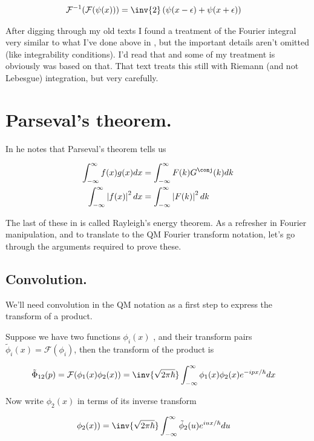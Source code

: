 \documentclass{article}
\newcommand{\FF}[0]{\mathcal{F}}
\newcommand{\FM}[0]{\inv{\sqrt{2\pi\hbar}}}
\newcommand{\Iinf}[1]{ \int_{-\infty}^\infty {#1}}
\begin{document}
\begin{align*}
\FF^{-1}(\FF(\psi(x))) &= \inv{2} \left( \psi(x -\epsilon) + \psi(x + \epsilon) \right)
\end{align*}

After digging through my old texts I found a treatment of the Fourier integral very similar to what I've done above
in \cite{lepage1980cva}, but the important details aren't omitted (like integrability conditions).
I'd read that and some of my treatment is obviously was based on that.  That text 
treats this still with Riemann (and not Lebesgue) integration, but very carefully.

\section{ Parseval's theorem. }

In \cite{mcmahon2005qmd} he notes that Parseval's theorem tells us

\begin{align*}
\Iinf{f(x)g(x) dx} &= \Iinf{F(k)G^\conj(k) dk} \\
\Iinf{\Abs{f(x)}^2 dx} &= \Iinf{\Abs{F(k)}^2 dk}
\end{align*}

The last of these in \cite{haykin1994cs} is called Rayleigh's energy theorem.  
As a refresher in 
Fourier manipulation, and to translate to the QM Fourier transform notation, let's go through the arguments
required to prove these.

\subsection{ Convolution. }

We'll need convolution in the QM notation as a first step to express
the transform of a product.

Suppose we have two functions 
$\phi_i(x)$
, and their transform
pairs 
$\tilde{\phi}_i(x) = \FF(\phi_i)$, then the transform of the product is

\begin{align*}
\tilde{\Phi}_{12}(p) = \FF(\phi_1(x)\phi_2(x)) &= \FM \Iinf{\phi_1(x) \phi_2(x) e^{-ipx/\hbar} dx}
\end{align*}

Now write $\phi_2(x)$ in terms of its inverse transform

\begin{align*}
\phi_2(x)) &= \FM \Iinf{\tilde{\phi}_2(u) e^{iux/\hbar} du}
\end{align*}
\end{document}
